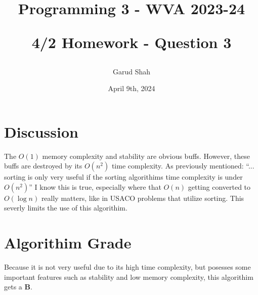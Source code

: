 \documentclass{article}
\title{
    \begin{center}
        Programming 3 - WVA 2023-24
    \end{center}
    \begin{center}
        \textbf{4/2 Homework - Question 3}
    \end{center}}
\date{April 9th, 2024}
\author{Garud Shah}
\begin{document}
\maketitle
\section{Discussion}
The $O(1)$ memory complexity and stability are obvious buffs. However, these buffs are destroyed by its $O(n^2)$ time complexity. As 
previously mentioned: \newline
``... sorting is only very useful if the sorting algorithims time complexity is under $O(n^2)$'' \newline
I know this is true, especially where that $O(n)$ getting converted to $O(\log n)$ really matters, like in USACO problems that utilize sorting.
This severly limits the use of this algorithim.
\section{Algorithim Grade}
Because it is not very useful due to its high time complexity, but posesses some important features such as stability and low memory
complexity, this algorithim gets a \textbf{B}.
\end{document}
